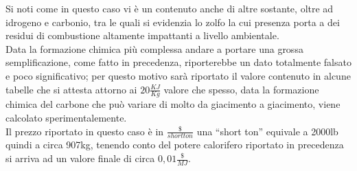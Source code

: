 Si noti come in questo caso vi è un contenuto anche di altre sostante, oltre ad idrogeno e carbonio, tra le quali si evidenzia lo zolfo la cui presenza porta a dei residui di combustione altamente impattanti a livello ambientale.\\
Data la formazione chimica più complessa andare a portare una grossa semplificazione, come fatto in precedenza, riporterebbe un dato totalmente falsato e poco significativo; per questo motivo sarà riportato il valore contenuto in alcune tabelle che si attesta attorno ai  $20\frac{KJ}{Kg}$ valore che spesso, data la formazione chimica del carbone che può variare di molto da giacimento a giacimento, viene calcolato sperimentalemente.\\
Il prezzo riportato in questo caso è in $\frac{\$}{short ton}$ una \enquote{short ton} equivale a 2000lb quindi a circa 907kg, tenendo conto del potere calorifero riportato in precedenza si arriva ad un valore finale di circa $0,01\frac{\$}{MJ}$.
\vfill
\newpage
